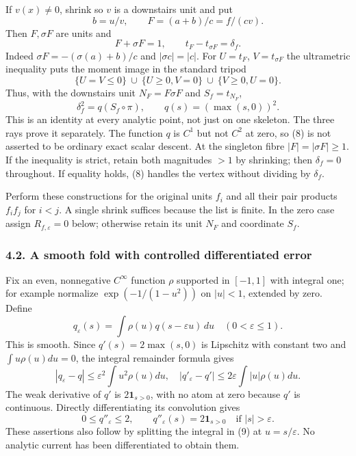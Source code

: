 \documentclass[
  11pt,
]{article}
\begin{document}
If \(v(x)\ne0\), shrink so \(v\) is a downstairs unit and put \[
 b=u/v,\qquad F=(a+b)/c=f/(cv).
\] Then \(F,\sigma F\) are units and \[
 F+\sigma F=1,\qquad
 t_F-t_{\sigma F}=\delta_f.                                \tag{6}
\] Indeed \(\sigma F=-(\sigma(a)+b)/c\) and \(|\sigma c|=|c|\). For
\(U=t_F\), \(V=t_{\sigma F}\) the ultrametric inequality puts the moment
image in the standard tripod \[
 \{U=V\leq0\}\ \cup\ \{U\geq0,V=0\}\ \cup\ \{V\geq0,U=0\}.
                                                                    \tag{7}
\] Thus, with the downstairs unit \(N_F=F\sigma F\) and \(S_f=t_{N_F}\),
\[
 \delta_f^2=q(S_f\circ\pi),\qquad q(s)=(\max(s,0))^2.        \tag{8}
\] This is an identity at every analytic point, not just on one
skeleton. The three rays prove it separately. The function \(q\) is
\(C^1\) but not \(C^2\) at zero, so (8) is not asserted to be ordinary
exact scalar descent. At the singleton fibre \(|F|=|\sigma F|\geq1\). If
the inequality is strict, retain both magnitudes \(>1\) by shrinking;
then \(\delta_f=0\) throughout. If equality holds, (8) handles the
vertex without dividing by \(\delta_f\).

Perform these constructions for the original units \(f_i\) and all their
pair products \(f_if_j\) for \(i<j\). A single shrink suffices because
the list is finite. In the zero case assign \(R_{f,\varepsilon}=0\)
below; otherwise retain its unit \(N_F\) and coordinate \(S_f\).

\subsubsection{4.2. A smooth fold with controlled differentiated
error}\label{a-smooth-fold-with-controlled-differentiated-error}

Fix an even, nonnegative \(C^\infty\) function \(\rho\) supported in
\([-1,1]\) with integral one; for example normalize \(\exp(-1/(1-u^2))\)
on \(|u|<1\), extended by zero. Define \[
 q_\varepsilon(s)=\int\rho(u)q(s-\varepsilon u)\,du
 \quad(0<\varepsilon\leq1).                               \tag{9}
\] This is smooth. Since \(q'(s)=2\max(s,0)\) is Lipschitz with constant
two and \(\int u\rho(u)du=0\), the integral remainder formula gives \[
 |q_\varepsilon-q|\leq\varepsilon^2\int u^2\rho(u)du,
 \quad |q'_\varepsilon-q'|\leq2\varepsilon\int|u|\rho(u)du.
                                                                    \tag{10}
\] The weak derivative of \(q'\) is \(2\mathbf1_{s>0}\), with no atom at
zero because \(q'\) is continuous. Directly differentiating its
convolution gives \[
 0\leq q''_\varepsilon\leq2,\qquad
 q''_\varepsilon(s)=2\mathbf1_{s>0}\quad\text{if }|s|>\varepsilon.
                                                                    \tag{11}
\] These assertions also follow by splitting the integral in (9) at
\(u=s/\varepsilon\). No analytic current has been differentiated to
obtain them.
\end{document}
